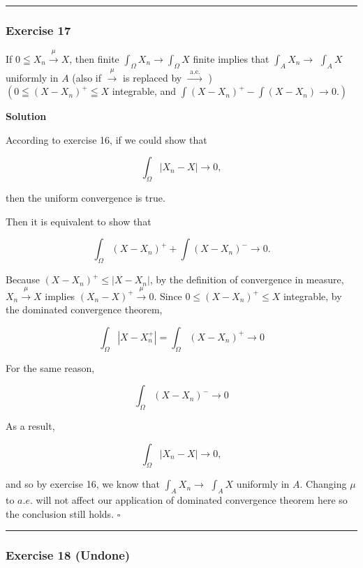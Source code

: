 \documentclass[
]{article}
\begin{document}
\begin{center}\rule{0.5\linewidth}{0.5pt}\end{center}

\hypertarget{exercise-17}{%
  \subsubsection{Exercise 17}\label{exercise-17}}

If \(0 \leqq X_n \stackrel{\mu}{\rightarrow} X\), then finite
\(\int_{\Omega} X_n \rightarrow \int_{\Omega} X\) finite implies that
\(\int_A X_n \rightarrow\) \(\int_A X\) uniformly in \(A\) (also if
\(\stackrel{\mu}{\longrightarrow}\) is replaced by
\(\stackrel{\text { a.e. }}{\longrightarrow}\) )\\
\(\left(0 \leqq\left(X-X_n\right)^{+} \leqq X\right.\) integrable, and
\(\left.\int\left(X-X_n\right)^{+}-\int\left(X-X_n\right) \rightarrow 0.\right)\)

\textbf{Solution}

According to exercise 16, if we could show that

\[\int_{\Omega} |X_n - X| \to 0,\]

then the uniform convergence is true.

Then it is equivalent to show that

\[\int_{\Omega} (X - X_n)^+ + \int (X - X_n)^- \to 0.\]

Because \((X - X_n)^+ \le |X - X_n|\), by the definition of convergence
in measure, \(X_n \xrightarrow{\mu} X\) implies
\((X_n - X)^+ \xrightarrow{\mu} 0\). Since \(0 \le (X - X_n)^+ \le X\)
integrable, by the dominated convergence theorem,

\[\int_{\Omega} |X - X_n^+| = \int_{\Omega} (X - X_n)^+ \to 0\]

For the same reason,

\[\int_{\Omega} (X - X_n)^- \to 0\]

As a result,

\[\int_{\Omega} |X_n - X| \to 0,\]

and so by exercise 16, we know that \(\int_A X_n \rightarrow\)
\(\int_A X\) uniformly in \(A\). Changing \(\mu\) to \(a.e.\) will not
affect our application of dominated convergence theorem here so the
conclusion still holds. \(\square\)

\begin{center}\rule{0.5\linewidth}{0.5pt}\end{center}

\hypertarget{exercise-18-undone}{%
  \subsubsection{Exercise 18 (Undone)}\label{exercise-18-undone}}
\end{document}
